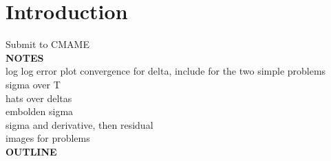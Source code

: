 \section{Introduction}

Submit to CMAME \\


{\bf NOTES} \\
log log error plot convergence for delta, include for the two simple problems \\
sigma over T \\
hats over deltas \\
embolden sigma \\
sigma and derivative, then residual \\
images for problems \\

{\bf OUTLINE} \\

